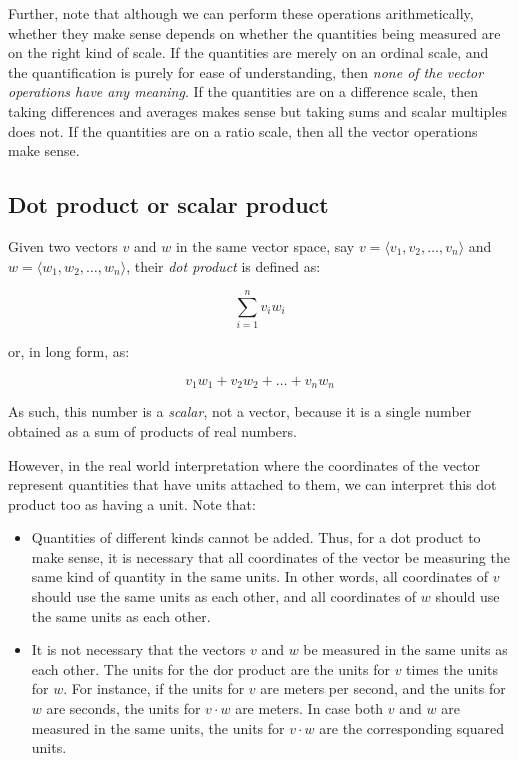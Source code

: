 \documentclass[10pt]{amsart}
\begin{document}
Further, note that although we can perform these operations
arithmetically, whether they make sense depends on whether the
quantities being measured are on the right kind of scale. If the
quantities are merely on an ordinal scale, and the quantification is
purely for ease of understanding, then {\em none of the vector
operations have any meaning}. If the quantities are on a difference
scale, then taking differences and averages makes sense but taking
sums and scalar multiples does not. If the quantities are on a ratio
scale, then all the vector operations make sense.

\subsection{Dot product or scalar product}

Given two vectors $v$ and $w$ in the same vector space, say $v =
\langle v_1,v_2,\dots,v_n \rangle$ and $w = \langle w_1,w_2,\dots,w_n
\rangle$, their {\em dot product} is defined as:

$$\sum_{i=1}^n v_iw_i$$

or, in long form, as:

$$v_1w_1 + v_2w_2 + \dots + v_nw_n$$

As such, this number is a {\em scalar}, not a vector, because it is a
single number obtained as a sum of products of real numbers.

However, in the real world interpretation where the coordinates of the
vector represent quantities that have units attached to them, we can
interpret this dot product too as having a unit. Note that:

\begin{itemize}
\item Quantities of different kinds cannot be added. Thus, for a dot
  product to make sense, it is necessary that all coordinates of the
  vector be measuring the same kind of quantity in the same units. In
  other words, all coordinates of $v$ should use the same units as
  each other, and all coordinates of $w$ should use the same units as
  each other.
\item It is not necessary that the vectors $v$ and $w$ be measured in
  the same units as each other. The units for the dor product are the
  units for $v$ times the units for $w$. For instance, if the units
  for $v$ are meters per second, and the units for $w$ are seconds,
  the units for $v \cdot w$ are meters. In case both $v$ and $w$ are
  measured in the same units, the units for $v \cdot w$ are the
  corresponding squared units.
\end{itemize}
\end{document}
